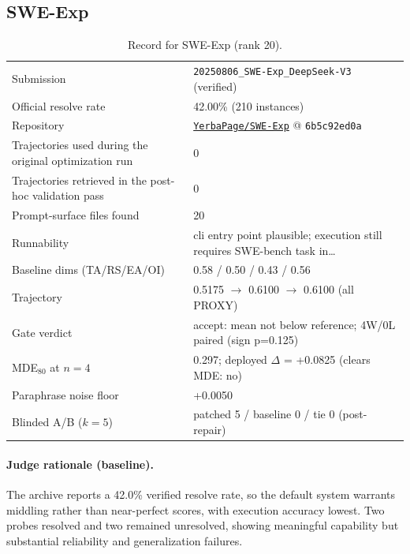 \subsection{SWE-Exp}
\label{app:agent20}
\begin{table}[h]\centering\scriptsize
\caption{Record for SWE-Exp (rank 20).}
\begin{tabular}{lp{8.2cm}}\toprule
Submission & \texttt{20250806\_\allowbreak{}SWE-Exp\_\allowbreak{}DeepSeek-V3} (verified) \\
Official resolve rate & 42.00\% (210 instances) \\
Repository & \href{https://github.com/YerbaPage/SWE-Exp}{\texttt{YerbaPage/SWE-Exp}} @ \texttt{6b5c92ed0a} \\
Trajectories used during the original optimization run & 0 \\
Trajectories retrieved in the post-hoc validation pass & 0 \\
Prompt-surface files found & 20 \\
Runnability & cli entry point plausible; execution still requires SWE-bench task in\ldots{} \\
Baseline dims (TA/RS/EA/OI) & 0.58 / 0.50 / 0.43 / 0.56 \\
Trajectory & 0.5175 $\to$ 0.6100 $\to$ 0.6100 (all PROXY) \\
Gate verdict & accept: mean not below reference; 4W/0L paired (sign p=0.125) \\
MDE$_{80}$ at $n{=}4$ & 0.297; deployed $\Delta$ = +0.0825 (clears MDE: no) \\
Paraphrase noise floor & +0.0050 \\
Blinded A/B ($k{=}5$) & patched 5 / baseline 0 / tie 0 (post-repair) \\
\bottomrule\end{tabular}\end{table}
\paragraph{Judge rationale (baseline).}
The archive reports a 42.0\% verified resolve rate, so the default system warrants middling rather than near-perfect scores, with execution accuracy lowest. Two probes resolved and two remained unresolved, showing meaningful capability but substantial reliability and generalization failures.
